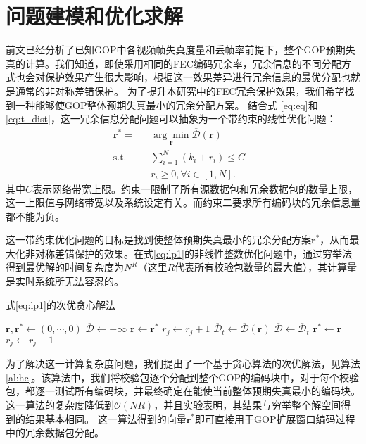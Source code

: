 \section{问题建模和优化求解}
前文已经分析了已知GOP中各视频帧失真度量和丢帧率前提下，整个GOP预期失真的计算。我们知道，即使采用相同的FEC编码冗余率，冗余信息的不同分配方式也会对保护效果产生很大影响，根据这一效果差异进行冗余信息的最优分配也就是通常的非对称差错保护。
为了提升本研究中的FEC冗余保护效果，我们希望找到一种能够使GOP整体预期失真最小的冗余分配方案。
结合式 \ref{eq:eq}和 \ref{eq:t_dist}，这一冗余信息分配问题可以抽象为一个带约束的线性优化问题：
\begin{equation}
\label{eq:lp1}
\begin{aligned}
& \mathbf{r}^{*} =
& & \underset{\mathbf{r}}{\arg\min} \overline{\mathcal{D}}(\mathbf{r}) \\
& \text{s.t.}
& & \sum_{i=1}^{N}(k_i + r_i) \le C \\
&&& r_i \ge 0, \forall i \in [1,N]. &{} &
\end{aligned}
\end{equation}
其中$C$表示网络带宽上限。约束一限制了所有源数据包和冗余数据包的数量上限，这一上限值与网络带宽以及系统设定有关。而约束二要求所有编码块的冗余信息量都不能为负。

这一带约束优化问题的目标是找到使整体预期失真最小的冗余分配方案$\mathbf{r}^{*}$，从而最大化非对称差错保护的效果。在式\ref{eq:lp1}的非线性整数优化问题中，通过穷举法得到最优解的时间复杂度为$N^{R}$（这里$R$代表所有校验包数量的最大值），其计算量是实时系统所无法容忍的。

\begin{algorithm}[htbp]
\caption{式\ref{eq:lp1}的次优贪心解法}
\label{al:hc}
    \begin{algorithmic}
    \State $\mathbf{r}, \mathbf{r}^{*} \gets (0,\cdots,0)$
    \State $\overline{\mathcal{D}} \gets +\infty$
        \State $\mathbf{r} \gets \mathbf{r}^{*}$
            \State $r_j \gets r_j + 1$
            \State $\overline{\mathcal{D}}_{t} \gets \overline{\mathcal{D}}(\mathbf{r})$
                \State $\overline{\mathcal{D}} \gets \overline{\mathcal{D}}_{t}$
                \State $\mathbf{r}^{*} \gets \mathbf{r}$
            \EndIf
            \State $r_j \gets r_j - 1$
        \EndFor
    \EndFor
    \end{algorithmic}
\end{algorithm}

为了解决这一计算复杂度问题，我们提出了一个基于贪心算法的次优解法，见算法 \ref{al:hc}。该算法中，我们将校验包逐个分配到整个GOP的编码块中，对于每个校验包，都逐一测试所有编码块，并最终确定在能使当前整体预期失真最小的编码块。这一算法的复杂度降低到$\mathcal{O}(NR)$，并且实验表明，其结果与穷举整个解空间得到的结果基本相同。
这一算法得到的向量$\mathbf{r}^{*}$即可直接用于GOP扩展窗口编码过程中的冗余数据包分配。

